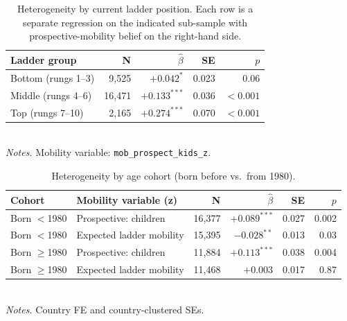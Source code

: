 \documentclass[11pt,a4paper]{article}
\begin{document}
\begin{table}[!ht]
\small
\centering
\caption{Heterogeneity by current ladder position. Each row is a separate regression on
the indicated sub-sample with prospective-mobility belief on the right-hand side.}
\label{tab:ladder}
\begin{tabular}{lrrrr}
\toprule
Ladder group & N & $\hat\beta$ & SE & $p$ \\
\midrule
Bottom (rungs 1--3) & 9{,}525  & $+0.042^{*}$   & 0.023 & 0.06    \\
Middle (rungs 4--6) & 16{,}471 & $+0.133^{***}$ & 0.036 & $<0.001$\\
Top (rungs 7--10)   & 2{,}165  & $+0.274^{***}$ & 0.070 & $<0.001$\\
\bottomrule
\end{tabular}
\\\footnotesize \emph{Notes.} Mobility variable: \texttt{mob\_prospect\_kids\_z}.
\end{table}

\begin{table}[!ht]
\small
\centering
\caption{Heterogeneity by age cohort (born before vs.\ from 1980).}
\label{tab:cohort}
\begin{tabular}{llrrrr}
\toprule
Cohort & Mobility variable (z) & N & $\hat\beta$ & SE & $p$ \\
\midrule
Born $<$1980    & Prospective: children      & 16{,}377 & $+0.089^{***}$ & 0.027 & 0.002 \\
Born $<$1980    & Expected ladder mobility   & 15{,}395 & $-0.028^{**}$  & 0.013 & 0.03  \\
Born $\geq$1980 & Prospective: children      & 11{,}884 & $+0.113^{***}$ & 0.038 & 0.004 \\
Born $\geq$1980 & Expected ladder mobility   & 11{,}468 & $+0.003$       & 0.017 & 0.87  \\
\bottomrule
\end{tabular}
\\\footnotesize \emph{Notes.} Country FE and country-clustered SEs.
\end{table}
\end{document}

